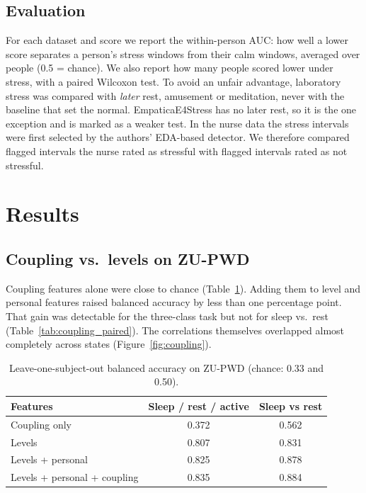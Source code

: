 \documentclass{article}
\begin{document}
\subsection{Evaluation}
For each dataset and score we report the within-person AUC: how well a lower score separates a person's stress windows from their calm windows, averaged over people (0.5 = chance). We also report how many people scored lower under stress, with a paired Wilcoxon test. To avoid an unfair advantage, laboratory stress was compared with \emph{later} rest, amusement or meditation, never with the baseline that set the normal. EmpaticaE4Stress has no later rest, so it is the one exception and is marked as a weaker test. In the nurse data the stress intervals were first selected by the authors' EDA-based detector. We therefore compared flagged intervals the nurse rated as stressful with flagged intervals rated as not stressful.

\section{Results}

\subsection{Coupling vs.\ levels on ZU-PWD}
Coupling features alone were close to chance (Table~\ref{tab:coupling}). Adding them to level and personal features raised balanced accuracy by less than one percentage point. That gain was detectable for the three-class task but not for sleep vs.\ rest (Table~\ref{tab:coupling_paired}). The correlations themselves overlapped almost completely across states (Figure~\ref{fig:coupling}).

\begin{table}[htbp]
\centering
\caption{Leave-one-subject-out balanced accuracy on ZU-PWD (chance: 0.33 and 0.50).}
\label{tab:coupling}
\begin{tabular}{lcc}
\toprule
Features & Sleep / rest / active & Sleep vs rest \\
\midrule
Coupling only & 0.372 & 0.562 \\
Levels & 0.807 & 0.831 \\
Levels + personal & 0.825 & 0.878 \\
Levels + personal + coupling & 0.835 & 0.884 \\
\bottomrule
\end{tabular}
\end{table}
\end{document}
